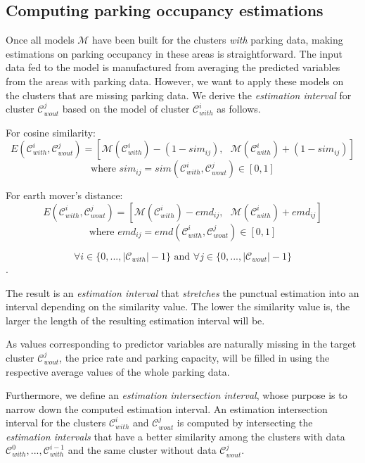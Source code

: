 \documentclass{ws-ijait}
\begin{document}
	\subsection{Computing parking occupancy estimations}
	Once all models $\mathcal{M}$ have been built for the clusters \textit{with} parking data, making estimations on parking occupancy in these areas is straightforward. The input data fed to the model is manufactured from averaging the predicted variables from the areas with parking data. However, we want to apply these models on the clusters that are missing parking data. We derive the \textit{estimation interval} for cluster $\mathcal{C}_{wout}^j$ based on the model of cluster $\mathcal{C}_{with}^i$ as follows.
	
	For cosine similarity:
	\begin{equation}
	E(\mathcal{C}_{with}^i,\mathcal{C}_{wout}^j) = [\mathcal{M}(\mathcal{C}_{with}^i) - (1 - sim_{ij}), \text{    } \mathcal{M}(\mathcal{C}_{with}^i) + (1 - sim_{ij})]
	\end{equation}
	$$\text{where } sim_{ij} = sim(\mathcal{C}_{with}^i,\mathcal{C}_{wout}^j) \in [0,1]$$
	
	For earth mover's distance:
	\begin{equation}
	E(\mathcal{C}_{with}^i,\mathcal{C}_{wout}^j) = [\mathcal{M}(\mathcal{C}_{with}^i) - emd_{ij},   \text{    }\mathcal{M}(\mathcal{C}_{with}^i) + emd_{ij}]
	\end{equation}
	$$\text{where } emd_{ij} = emd(\mathcal{C}_{with}^i,\mathcal{C}_{wout}^j) \in [0,1]$$
	
	$$\forall i \in \{0,...,|\mathcal{C}_{with}|-1\} \text{ and } \forall j \in \{0,...,|\mathcal{C}_{wout}|-1\}$$.
	
	The result is an \textit{estimation interval} that \textit{stretches} the punctual estimation into an interval depending on the similarity value. The lower the similarity value is, the larger the length of the resulting estimation interval will be.
	
	As values corresponding to predictor variables are naturally missing in the target cluster $\mathcal{C}_{wout}^j$, the price rate and parking capacity, will be filled in using the respective average values of the whole parking data. 
	
	Furthermore, we define an \textit{estimation intersection interval}, whose purpose is to narrow down the computed estimation interval.
	An estimation intersection interval for the clusters $\mathcal{C}_{with}^i$ and $\mathcal{C}_{wout}^j$ is computed by intersecting the \textit{estimation intervals} that have a better similarity among the clusters with data $\mathcal{C}_{with}^{0}, ..., \mathcal{C}_{with}^{i-1}$ and the same cluster without data $\mathcal{C}_{wout}^j$.
	
\end{document}
